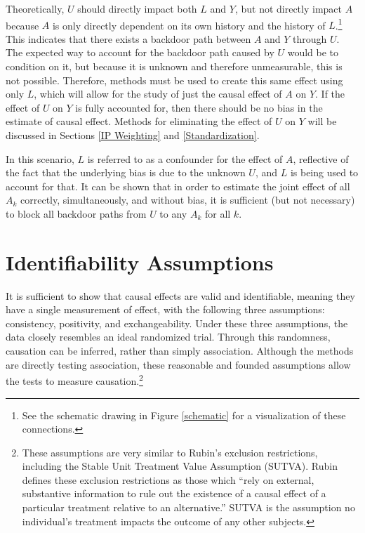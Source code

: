 Theoretically, $U$ should directly impact both $L$ and $Y$, but not directly impact $A$ because $A$ is only directly dependent on its own history and the history of $L$.\footnote{See the schematic drawing in Figure \ref{schematic} for a visualization of these connections.}  This indicates that there exists a backdoor path between $A$ and $Y$ through $U$.\cite{wright2015international}  The expected way to account for the backdoor path caused by $U$ would be to condition on it, but because it is unknown and therefore unmeasurable, this is not possible.  Therefore, methods must be used to create this same effect using only $L$, which will allow for the study of just the causal effect of $A$ on $Y$.  If the effect of $U$ on $Y$ is fully accounted for, then there should be no bias in the estimate of causal effect.  Methods for eliminating the effect of $U$ on $Y$ will be discussed in Sections \ref{IP Weighting} and \ref{Standardization}.  

In this scenario, $L$ is referred to as a confounder for the effect of $A$, reflective of the fact that the underlying bias is due to the unknown $U$, and $L$ is being used to account for that.  It can be shown that in order to estimate the joint effect of all $A_k$ correctly, simultaneously, and without bias, it is sufficient (but not necessary) to block all backdoor paths from $U$ to any $A_k$ for all $k$.\cite{pearl1995probabilistic}

\section{Identifiability Assumptions} \label{assumptions} 
It is sufficient to show that causal effects are valid and identifiable, meaning they have a single measurement of effect, with the following three assumptions: consistency, positivity, and exchangeability.\cite{cole2009consistency, hernan_robins_2016}   Under these three assumptions, the data closely resembles an ideal randomized trial.  Through this randomness, causation can be inferred, rather than simply association.  Although the methods are directly testing association, these reasonable and founded assumptions allow the tests to measure causation.\footnote{These assumptions are very similar to Rubin's exclusion restrictions, including the Stable Unit Treatment Value Assumption (SUTVA).\cite{rubin1980randomization}  Rubin defines these exclusion restrictions as those which ``rely on external, substantive information to rule out the existence of a causal effect of a particular treatment relative to an alternative.''\cite{imbens2015causal} SUTVA is the assumption no individual's treatment impacts the outcome of any other subjects.}
 
